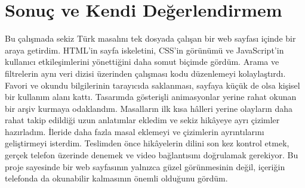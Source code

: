 \documentclass[12pt,a4paper]{article}
\begin{document}
\section{Sonuç ve Kendi Değerlendirmem}
Bu çalışmada sekiz Türk masalını tek dosyada çalışan bir web sayfası içinde bir araya getirdim. HTML'in sayfa iskeletini, CSS'in görünümü ve JavaScript'in kullanıcı etkileşimlerini yönettiğini daha somut biçimde gördüm. Arama ve filtrelerin aynı veri dizisi üzerinden çalışması kodu düzenlemeyi kolaylaştırdı. Favori ve okundu bilgilerinin tarayıcıda saklanması, sayfaya küçük de olsa kişisel bir kullanım alanı kattı. Tasarımda gösterişli animasyonlar yerine rahat okunan bir arşiv kurmaya odaklandım. Masalların ilk kısa hâlleri yerine olayların daha rahat takip edildiği uzun anlatımlar ekledim ve sekiz hikâyeye ayrı çizimler hazırladım. İleride daha fazla masal eklemeyi ve çizimlerin ayrıntılarını geliştirmeyi isterdim. Teslimden önce hikâyelerin dilini son kez kontrol etmek, gerçek telefon üzerinde denemek ve video bağlantısını doğrulamak gerekiyor. Bu proje sayesinde bir web sayfasının yalnızca güzel görünmesinin değil, içeriğin telefonda da okunabilir kalmasının önemli olduğunu gördüm.
\end{document}
